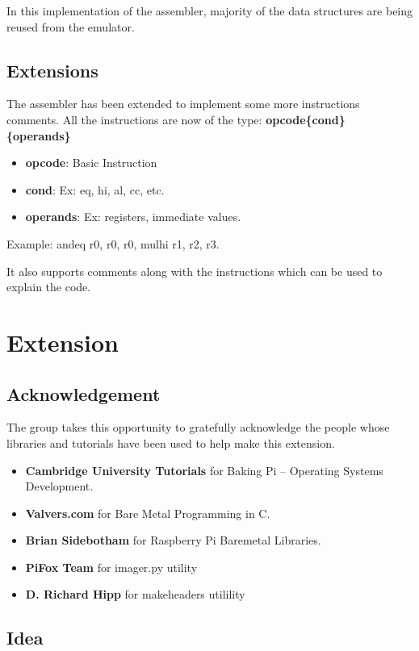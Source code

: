 \documentclass[11pt]{article}
\begin{document}
In this implementation of the assembler, majority of the data structures are
being reused from the emulator.

\subsection{Extensions}

The assembler has been extended to implement some more instructions comments.
All the instructions are now of the type:
\textbf{opcode\{cond\} \{operands\}}
\begin{itemize}[noitemsep,topsep=0pt]
  \item \textbf{opcode}: Basic Instruction
  \item \textbf{cond}: Ex: eq, hi, al, cc, etc.
  \item \textbf{operands}: Ex: registers, immediate values.
\end{itemize}
Example: andeq r0, r0, r0, mulhi r1, r2, r3.

It also supports comments along with the instructions which can be used to
explain the code.

\section{Extension}

\subsection{Acknowledgement}

The group takes this opportunity to gratefully acknowledge the people whose
libraries and tutorials have been used to help make this extension.

\begin{itemize}[noitemsep,topsep=0pt]
  \item \textbf{Cambridge University Tutorials} for Baking Pi –
    Operating Systems Development.
  \item \textbf{Valvers.com} for Bare Metal Programming in C.
  \item \textbf{Brian Sidebotham} for Raspberry Pi Baremetal Libraries.
  \item \textbf{PiFox Team} for imager.py utility
  \item \textbf{D. Richard Hipp} for makeheaders utilility
\end{itemize}


\subsection{Idea}
\end{document}

